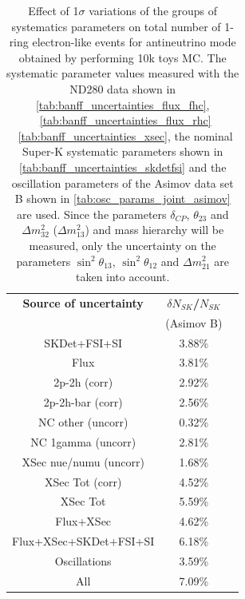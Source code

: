 
\begin{table}[htb]
\centering
\begin{tabular}{| c | c | c |}
\hline
  {\bf Source of uncertainty}    & \multicolumn{1}{c|}{{\bf ${\delta}N_{SK}$/$N_{SK}$}}\\
                                 & \multicolumn{1}{c|}{(Asimov B)}\\

\hline
\hline  SKDet+FSI+SI                   & 3.88\%                        \\
\hline
  Flux                           & 3.81\%                        \\
\hline
\hline
  2p-2h (corr)                     & 2.92\%                        \\
  2p-2h-bar (corr)                  & 2.56\%                        \\
  NC other (uncorr)              & 0.32\%                        \\
  NC 1gamma (uncorr)             & 2.81\%                        \\
  XSec nue/numu (uncorr)                 & 1.68\%                        \\
\hline  
  XSec Tot (corr)                  & 4.52\%                        \\
  XSec Tot                       & 5.59\%                        \\
\hline
\hline
  Flux+XSec                      & 4.62\%                        \\
\hline
\hline
  Flux+XSec+SKDet+FSI+SI         & 6.18\%                        \\
\hline
\hline
  Oscillations                   & 3.59\%                        \\
\hline
\hline
  All                            & 7.09\%                        \\
\hline
\hline

\end{tabular}
\caption{
 Effect of 1$\sigma$ variations of the groups of systematics parameters on total number of
 1-ring electron-like events for antineutrino mode obtained by performing 10k toys MC.
The systematic parameter values measured with the ND280 data 
shown in 
\cref{tab:banff_uncertainties_flux_fhc},
~\ref{tab:banff_uncertainties_flux_rhc}
~\ref{tab:banff_uncertainties_xsec},
the nominal Super-K systematic parameters shown in \cref{tab:banff_uncertainties_skdetfsi}
and the oscillation parameters of the Asimov data set B shown in \cref{tab:osc_params_joint_asimov}
are used.
Since the parameters $\delta_{CP}$, $\theta_{23}$ and $\Delta m^2_{32}$ ($\Delta m^2_{13}$) and mass hierarchy
will be measured,
only the uncertainty on the parameters 
$\sin^2 \theta_{13}$,
$\sin^2 \theta_{12}$
and 
$\Delta m^2_{21}$ 
are taken into account.
}                                                                                                                                                                                          
\label{tab:nsk_systematic_table_summary_joint_asimov_B_rhc_elike}
\end{table}

